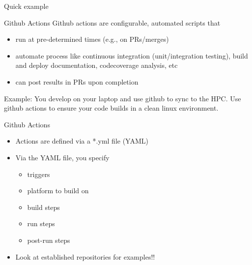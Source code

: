 \documentclass{beamer}
\begin{document}
\begin{frame}{Quick example}
  
\end{frame}

\begin{frame}{Github Actions}
  Github actions are configurable, automated scripts that
  \begin{itemize}
  \item run at pre-determined times (e.g., on PRs/merges)
  \item automate process like continuous integration (unit/integration testing), build and deploy documentation, codecoverage analysis, etc
  \item can post results in PRs upon completion
  \end{itemize}
  \vspace{0.5cm}
  
  Example: You develop on your laptop and use github to sync to the HPC. Use github actions to ensure your code builds in a clean linux environment.
  
  \vspace{0.5cm}
  
  
\end{frame}

\begin{frame}{Github Actions}
  \begin{itemize}
  \item Actions are defined via a *.yml file (YAML)
  \item Via the YAML file, you specify
    \begin{itemize}
    \item triggers
    \item platform to build on
    \item build steps
    \item run steps
    \item post-run steps
    \end{itemize}
  \item Look at established repositories for examples!!
  \end{itemize}
\end{frame}
\end{document}
